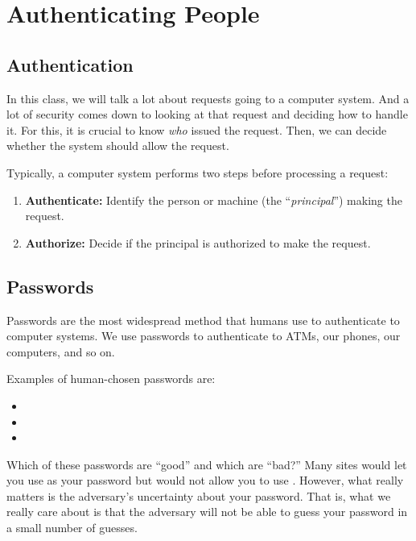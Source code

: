 \chapter{Authenticating People}


\section{Authentication}
In this class, we will talk a lot about requests
going to a computer system.
And a lot of security comes down to looking at that request and deciding
how to handle it.
For this, it is crucial to know
\textit{who} issued the request. Then, we can
decide whether the system should allow the request. 

Typically, a computer system performs two steps before processing
a request:
\begin{enumerate}
  \item \textbf{Authenticate:} Identify the person or machine (the ``\emph{principal}'') making the request.
  \item \textbf{Authorize:} Decide if the principal is authorized to make the request.
\end{enumerate}

\section{Passwords}
Passwords are the most widespread method 
that humans use to authenticate to computer systems.
We use passwords to authenticate to ATMs,
our phones, our computers, and so on.

Examples of human-chosen passwords are:
\begin{itemize}
	\item {}
	\item {}
	\item {}
\end{itemize}

Which of these passwords are ``good'' and which
are ``bad?''
Many sites would let you use
 as your password but would not allow
you to use .
However, what really matters is the adversary's
uncertainty about your password.
That is, what we really care about is that the adversary
will not be able to guess your password in
a small number of guesses.


